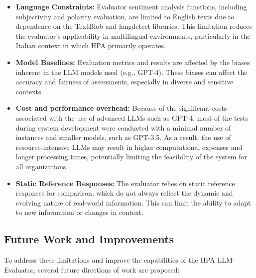 \begin{itemize}
    \item \textbf{Language Constraints:} Evaluator sentiment analysis functions, including subjectivity and polarity evaluation, are limited to English texts due to dependence on the TextBlob and langdetect libraries. This limitation reduces the evaluator's applicability in multilingual environments, particularly in the Italian context in which HPA primarily operates.
    \item \textbf{Model Baselines:} Evaluation metrics and results are affected by the biases inherent in the LLM models used (e.g., GPT-4). These biases can affect the accuracy and fairness of assessments, especially in diverse and sensitive contexts.
    \item \textbf{Cost and performance overhead:} Because of the significant costs associated with the use of advanced LLMs such as GPT-4, most of the tests during system development were conducted with a minimal number of instances and smaller models, such as GPT-3.5. As a result, the use of resource-intensive LLMs may result in higher computational expenses and longer processing times, potentially limiting the feasibility of the system for all organizations.
    \item \textbf{Static Reference Responses:} The evaluator relies on static reference responses for comparison, which do not always reflect the dynamic and evolving nature of real-world information. This can limit the ability to adapt to new information or changes in context.
\end{itemize}

\subsection{Future Work and Improvements}

To address these limitations and improve the capabilities of the HPA LLM-Evaluator, several future directions of work are proposed:

